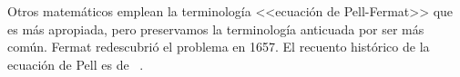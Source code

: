 \documentclass[teoria-numeros.tex]{subfiles}
\begin{document}
Otros matemáticos emplean la terminología <<ecuación de Pell-Fermat>> que es más apropiada, pero
preservamos la terminología anticuada por ser más común.
Fermat redescubrió el problema en 1657. 
El recuento histórico de la ecuación de Pell es de \citeauthor{williams:pell}~\cite{williams:pell}.

\printbibliography[segment=\therefsegment, check=onlynew, notcategory=history, notcategory=historical, notcategory=other]
\bibbycategory[segment=\therefsegment, check=onlynew]
\end{document}
